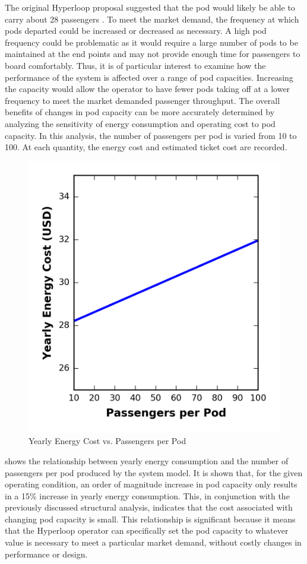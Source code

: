 The original Hyperloop proposal suggested
that the pod would likely be able to carry about 28 passengers \cite{Musk}.
To meet the market demand, the frequency at which pods departed could be
increased or decreased as necessary. A high pod frequency could be
problematic as it would require a large number of pods to be maintained at
the end points and may not provide enough time for passengers to board comfortably.
Thus, it is of particular interest to examine how the performance of the system
is affected over a range of pod capacities. Increasing the capacity would allow
the operator to have fewer pods taking off at a lower frequency to meet
the market demanded passenger throughput. The overall benefits of
changes in pod capacity can be more accurately determined by analyzing the
sensitivity of energy consumption and operating cost to pod capacity.
In this analysis, the number of passengers per pod is varied from 10 to 100.
At each quantity, the energy cost and estimated ticket cost are recorded.
\begin{figure}
	\centering
	\includegraphics[width=.45\textwidth]{../../images/graphs/capacity_trades/passengers_vs_energy.png}
	\caption{Yearly Energy Cost vs. Passengers per Pod}
	\label{fig:energy_cost_vs_passengers}
\end{figure}
 shows the relationship between yearly
energy consumption and the number of passengers per pod produced by the system model.
It is shown that, for the given operating condition, an order of magnitude
increase in pod capacity only results in a 15\% increase in yearly energy consumption.
This, in conjunction with the previously discussed structural analysis,
indicates that the cost associated with changing pod capacity is small.
This relationship is significant because it means that the Hyperloop operator
can specifically set the pod capacity to whatever value is necessary to meet a
particular market demand, without costly changes in performance or design.
